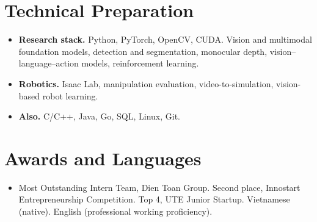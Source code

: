\documentclass[letterpaper,11pt]{article}
\begin{document}
\section*{Technical Preparation}

\begin{itemize}
  \item \textbf{Research stack.} Python, PyTorch, OpenCV, CUDA. Vision and multimodal foundation models, detection and segmentation, monocular depth, vision--language--action models, reinforcement learning.
  \item \textbf{Robotics.} Isaac Lab, manipulation evaluation, video-to-simulation, vision-based robot learning.
  \item \textbf{Also.} C/C++, Java, Go, SQL, Linux, Git.
\end{itemize}

\section*{Awards and Languages}

\begin{itemize}
  \item Most Outstanding Intern Team, Dien Toan Group. Second place, Innostart Entrepreneurship Competition. Top 4, UTE Junior Startup. Vietnamese (native). English (professional working proficiency).
\end{itemize}
\end{document}
